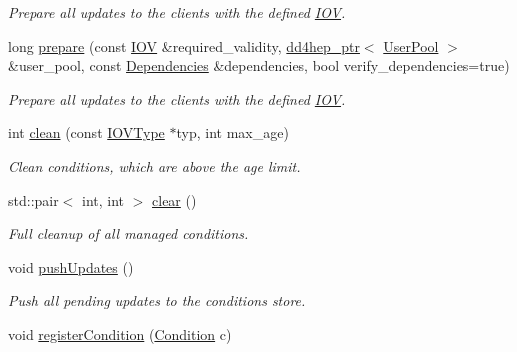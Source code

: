 \begin{DoxyCompactItemize}
\begin{DoxyCompactList}\small\item\em Prepare all updates to the clients with the defined \hyperlink{class_d_d4hep_1_1_i_o_v}{I\+OV}. \end{DoxyCompactList}\item 
long \hyperlink{class_d_d4hep_1_1_conditions_1_1_conditions_manager_object_a12104037c413426d82374b639acd88e8}{prepare} (const \hyperlink{class_d_d4hep_1_1_i_o_v}{I\+OV} \&required\+\_\+validity, \hyperlink{class_d_d4hep_1_1dd4hep__ptr}{dd4hep\+\_\+ptr}$<$ \hyperlink{class_d_d4hep_1_1_conditions_1_1_user_pool}{User\+Pool} $>$ \&user\+\_\+pool, const \hyperlink{class_d_d4hep_1_1_conditions_1_1_conditions_manager_object_a539905074db3aee8b401d575649dbdd8}{Dependencies} \&dependencies, bool verify\+\_\+dependencies=true)
\begin{DoxyCompactList}\small\item\em Prepare all updates to the clients with the defined \hyperlink{class_d_d4hep_1_1_i_o_v}{I\+OV}. \end{DoxyCompactList}\item 
int \hyperlink{class_d_d4hep_1_1_conditions_1_1_conditions_manager_object_aca6c43594d93ab8773e245b8cffb0f60}{clean} (const \hyperlink{class_d_d4hep_1_1_i_o_v_type}{I\+O\+V\+Type} $\ast$typ, int max\+\_\+age)
\begin{DoxyCompactList}\small\item\em Clean conditions, which are above the age limit. \end{DoxyCompactList}\item 
std\+::pair$<$ int, int $>$ \hyperlink{class_d_d4hep_1_1_conditions_1_1_conditions_manager_object_a16cf2685ed249700904621d9a68bcdb2}{clear} ()
\begin{DoxyCompactList}\small\item\em Full cleanup of all managed conditions. \end{DoxyCompactList}\item 
void \hyperlink{class_d_d4hep_1_1_conditions_1_1_conditions_manager_object_a9bda89e54e1ad3b202f7295ec6c102a8}{push\+Updates} ()
\begin{DoxyCompactList}\small\item\em Push all pending updates to the conditions store. \end{DoxyCompactList}\item 
void \hyperlink{class_d_d4hep_1_1_conditions_1_1_conditions_manager_object_af839b57cfdda205e2555e757651423fd}{register\+Condition} (\hyperlink{class_d_d4hep_1_1_conditions_1_1_condition}{Condition} c)

\end{DoxyCompactItemize}
